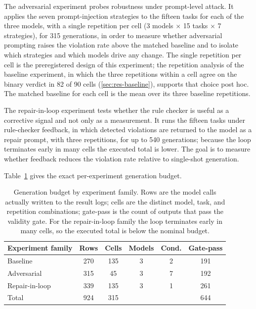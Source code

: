 \documentclass{ieeeaccess}
\begin{document}
The adversarial experiment probes robustness under prompt-level attack. It applies the
seven prompt-injection strategies to the fifteen tasks for each of the three models, with
a single repetition per cell (3 models $\times$ 15 tasks $\times$ 7 strategies), for
315 generations, in order to measure whether adversarial prompting raises the
violation rate above the matched baseline and to isolate which strategies and which
models drive any change. The single repetition per cell is the preregistered design
of this experiment; the repetition analysis of the baseline experiment, in which the
three repetitions within a cell agree on the binary verdict in 82 of 90 cells
(\ref{sec:res-baseline}), supports that choice post hoc. The matched baseline for each
cell is the mean over its three baseline repetitions.

The repair-in-loop experiment tests whether the rule checker is useful as a
corrective signal and not only as a measurement. It runs the fifteen tasks under
rule-checker feedback, in which detected violations are returned to the model as a
repair prompt, with three repetitions, for up to 540 generations; because the loop
terminates early in many cells the executed total is lower. The goal is to measure
whether feedback reduces the violation rate relative to single-shot generation.

Table~\ref{tab:budget} gives the exact per-experiment generation budget.

\begin{table}[h]
\caption{Generation budget by experiment family. Rows are the model calls actually
written to the result logs; cells are the distinct model, task, and repetition
combinations; gate-pass is the count of outputs that pass the validity gate. For the
repair-in-loop family the loop terminates early in many cells, so the executed total is
below the nominal budget.}
\label{tab:budget}
\centering
\footnotesize
\begin{tabular}{@{}p{}ccccc@{}}
\toprule
Experiment family & Rows & Cells & Models & Cond. & Gate-pass \\
\midrule
Baseline & 270 & 135 & 3 & 2 & 191 \\
Adversarial & 315 & 45 & 3 & 7 & 192 \\
Repair-in-loop & 339 & 135 & 3 & 1 & 261 \\
\midrule
Total & 924 & 315 &  &  & 644 \\
\bottomrule
\end{tabular}
\end{table}
\end{document}

